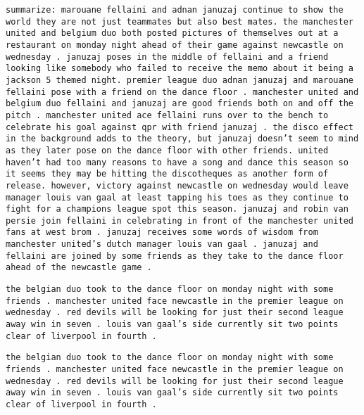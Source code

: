 \documentclass[twoside,11pt]{article}
\begin{document}
\begin{description}[leftmargin=0.5cm]
\item[Processed input:] \texttt{summarize:\ marouane fellaini and adnan januzaj continue to show the world they are not just teammates but also best mates. the manchester united and belgium duo both posted pictures of themselves out at a restaurant on monday night ahead of their game against newcastle on wednesday . januzaj poses in the middle of fellaini and a friend looking like somebody who failed to receive the memo about it being a jackson 5 themed night. premier league duo adnan januzaj and marouane fellaini pose with a friend on the dance floor . manchester united and belgium duo fellaini and januzaj are good friends both on and off the pitch . manchester united ace fellaini runs over to the bench to celebrate his goal against qpr with friend januzaj . the disco effect in the background adds to the theory, but januzaj doesn’t seem to mind as they later pose on the dance floor with other friends. united haven’t had too many reasons to have a song and dance this season so it seems they may be hitting the discotheques as another form of release. however, victory against newcastle on wednesday would leave manager louis van gaal at least tapping his toes as they continue to fight for a champions league spot this season. januzaj and robin van persie join fellaini in celebrating in front of the manchester united fans at west brom . januzaj receives some words of wisdom from manchester united's dutch manager louis van gaal . januzaj and fellaini are joined by some friends as they take to the dance floor ahead of the newcastle game .}
\item[Original target:] \texttt{the belgian duo took to the dance floor on monday night with some friends . manchester united face newcastle in the premier league on wednesday  . red devils will be looking for just their second league away win in seven  . louis van gaal's side currently sit two points clear of liverpool in fourth   .}
\item[Processed target:] \texttt{the belgian duo took to the dance floor on monday night with some friends . manchester united face newcastle in the premier league on wednesday  . red devils will be looking for just their second league away win in seven  . louis van gaal's side currently sit two points clear of liverpool in fourth   .}
\end{description}
\end{document}
